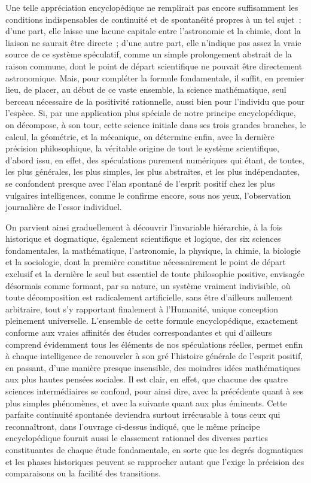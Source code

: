 \documentclass[french,twoside]{book} %
\begin{document}
Une telle appréciation encyclopédique ne remplirait pas encore suffisamment les conditions indispensables de continuité et de spontanéité propres à un tel sujet : d’une part, elle laisse une lacune capitale entre l’astronomie et la chimie, dont la liaison ne saurait être directe ; d’une autre part, elle n’indique pas assez la vraie source de ce système spéculatif, comme un simple prolongement abstrait de la raison commune, dont le point de départ scientifique ne pouvait être directement astronomique. Mais, pour compléter la formule fondamentale, il suffit, en premier lieu, de placer, au début de ce vaste ensemble, la science mathématique, seul berceau nécessaire de la positivité rationnelle, aussi bien pour l’individu que pour l’espèce. Si, par une application plus spéciale de notre principe encyclopédique, on décompose, à son tour, cette science initiale dans ses trois grandes branches, le calcul, la géométrie, et la mécanique, on détermine enfin, avec la dernière précision philosophique, la véritable origine de tout le système scientifique, d’abord issu, en effet, des spéculations purement numériques qui étant, de toutes, les plus générales, les plus simples, les plus abstraites, et les plus indépendantes, se confondent presque avec l’élan spontané de l’esprit positif chez les plus vulgaires intelligences, comme le confirme encore, sous nos yeux, l’observation journalière de l’essor individuel.\par
On parvient ainsi graduellement à découvrir l’invariable hiérarchie, à la fois historique et dogmatique, également scientifique et logique, des six sciences fondamentales, la mathématique, l’astronomie, la physique, la chimie, la biologie et la sociologie, dont la première constitue nécessairement le point de départ exclusif et la dernière le seul but essentiel de toute philosophie positive, envisagée désormais comme formant, par sa nature, un système vraiment indivisible, où toute décomposition est radicalement artificielle, sans être d’ailleurs nullement arbitraire, tout s’y rapportant finalement à l’Humanité, unique conception pleinement universelle. L’ensemble de cette formule encyclopédique, exactement conforme aux vraies affinités des études correspondantes et qui d’ailleurs comprend évidemment tous les éléments de nos spéculations réelles, permet enfin à chaque intelligence de renouveler à son gré l’histoire générale de l’esprit positif, en passant, d’une manière presque insensible, des moindres idées mathématiques aux plus hautes pensées sociales. Il est clair, en effet, que chacune des quatre sciences intermédiaires se confond, pour ainsi dire, avec la précédente quant à ses plus simples phénomènes, et avec la suivante quant aux plus éminents. Cette parfaite continuité spontanée deviendra surtout irrécusable à tous ceux qui reconnaîtront, dans l’ouvrage ci-dessus indiqué, que le même principe encyclopédique fournit aussi le classement rationnel des diverses parties constituantes de chaque étude fondamentale, en sorte que les degrés dogmatiques et les phases historiques peuvent se rapprocher autant que l’exige la précision des comparaisons ou la facilité des transitions.\par
\end{document}
